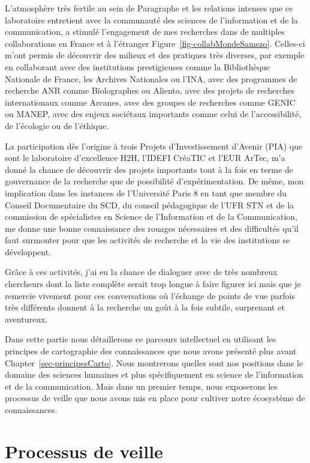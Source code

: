 \documentclass[
  letterpaper,
  DIV=11,
  numbers=noendperiod]{scrreprt}
\begin{document}
L'atmosphère très fertile au sein de Paragraphe et les relations
intenses que ce laboratoire entretient avec la communauté des sciences
de l'information et de la communication, a stimulé l'engagement de mes
recherches dans de multiples collaborations en France et à l'étranger
Figure~\ref{fig-collabMondeSamszo}. Celles-ci m'ont permis de découvrir
des milieux et des pratiques très diverses, par exemple en collaborant
avec des institutions prestigieuses comme la Bibliothèque Nationale de
France, les Archives Nationales ou l'INA, avec des programmes de
recherche ANR comme Biolographes ou Aliento, avec des projets de
recherches internationaux comme Arcanes, avec des groupes de recherches
comme GENIC ou MANEP, avec des enjeux sociétaux importants comme celui
de l'accessibilité, de l'écologie ou de l'éthique.

La participation dès l'origine à trois Projets d'Investissement d'Avenir
(PIA) que sont le laboratoire d'excellence H2H, l'IDEFI CréaTIC et l'EUR
ArTec, m'a donné la chance de découvrir des projets importants tout à la
fois en terme de gouvernance de la recherche que de possibilité
d'expérimentation. De même, mon implication dans les instances de
l'Université Paris 8 en tant que membre du Conseil Documentaire du SCD,
du conseil pédagogique de l'UFR STN et de la commission de spécialistes
en Science de l'Information et de la Communication, me donne une bonne
connaissance des rouages nécessaires et des difficultés qu'il faut
surmonter pour que les activités de recherche et la vie des institutions
se développent.

Grâce à ces activités, j'ai eu la chance de dialoguer avec de très
nombreux chercheurs dont la liste complète serait trop longue à faire
figurer ici mais que je remercie vivement pour ces conversations où
l'échange de points de vue parfois très différents donnent à la
recherche un goût à la fois subtile, surprenant et aventureux.

Dans cette partie nous détaillerons ce parcours intellectuel en
utilisant les principes de cartographie des connaissances que nous avons
présenté plus avant Chapter~\ref{sec-principesCarto}. Nous montrerons
quelles sont nos positions dans le domaine des sciences humaines et plus
spécifiquement en science de l'information et de la communication. Mais
dans un premier temps, nous exposerons les processus de veille que nous
avons mis en place pour cultiver notre écosystème de connaissances.

\hypertarget{sec-processusVeille}{%
\section{Processus de veille}\label{sec-processusVeille}}
\end{document}
